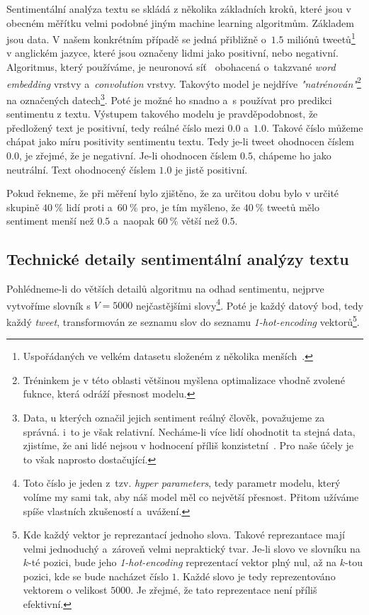 \documentclass[12pt, a4paper]{article}
\numberwithin{equation}{section} 	%
\begin{document}
Sentimentální analýza textu se skládá z několika základních kroků, které jsou v obecném měřítku velmi podobné jiným machine learning algoritmům. Základem jsou data. V našem konkrétním případě se jedná přibližně o~$1.5$ miliónů tweetů\footnote{Uspořádaných ve velkém datasetu složeném z několika menších~\cite{TwitterData1, TwitterData2}.} v anglickém jazyce, které jsou označeny lidmi jako positivní, nebo negativní. Algoritmus, který používáme, je neuronová síť~\cite{TwitterSentAnalysis} obohacená o~takzvané \textit{word embedding} vrstvy a~\textit{convolution} vrstvy. Takovýto model je nejdříve \textit{"natrénován"}\footnote{Tréninkem je v této oblasti většinou myšlena optimalizace vhodně zvolené fuknce, která odráží přesnost modelu.} na označených datech\footnote{Data, u kterých označil jejich sentiment reálný člověk, považujeme za správná. i~to je však relativní. Necháme-li více lidí ohodnotit ta stejná data, zjistíme, že ani lidé nejsou v hodnocení příliš konzistetní~\cite{HumanVsMachineLearning}. Pro naše účely je to však naprosto dostačující.}. Poté je možné ho snadno a~s používat pro predikci sentimentu z textu. Výstupem takového modelu je pravděpodobnost, že předložený text je positivní, tedy reálné číslo mezi $0.0$ a~$1.0$. Takové číslo můžeme chápat jako míru positivity sentimentu textu. Tedy je-li tweet ohodnocen číslem $0.0$, je zřejmé, že je negativní. Je-li ohodnocen číslem $0.5$, chápeme ho jako neutrální. Text ohodnocený číslem $1.0$ je jistě positivní.

Pokud řekneme, že při měření bylo zjištěno, že za určitou dobu bylo v určité skupině $40~\%$ lidí proti a~$60~\%$ pro, je tím myšleno, že $40~\%$ tweetů mělo sentiment menší než $0.5$ a~naopak $60~\%$ větší než $0.5$.

\subsection{Technické detaily sentimentální analýzy textu}
\noindent Pohlédneme-li do větších detailů algoritmu na odhad sentimentu, nejprve vytvoříme slovník s $V = 5000$ nejčastějšími slovy\footnote{Toto číslo je jeden z~tzv. \textit{hyper parameters}, tedy parametr modelu, který volíme my sami tak, aby náš model měl co největší přesnost. Přitom užíváme spíše vlastních zkušeností a~uvážení.}. Poté je každý datový bod, tedy každý \textit{tweet}, transformován ze seznamu slov do seznamu \textit{1-hot-encoding} vektorů\footnote{Kde každý vektor je reprezantací jednoho slova. Takové reprezantace mají velmi jednoduchý a~zároveň velmi nepraktický tvar. Je-li slovo ve slovníku na $k$-té pozici, bude jeho \textit{1-hot-encoding} reprezentací vektor plný nul, až na $k$-tou pozici, kde se bude nacházet číslo $1$. Každé slovo je tedy reprezentováno vektorem o velikost $5000$. Je zřejmé, že tato reprezentace není příliš efektivní.}.
\end{document}
